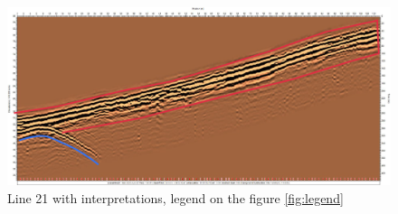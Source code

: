 \begin{figure}[p]
    \centering
    \includegraphics[width=\linewidth]{Images/00_Results/line21_edited.jpg}
    \caption{Line 21 with interpretations, legend on the figure \ref{fig:legend}}
    \label{fig:line21}
\end{figure}

